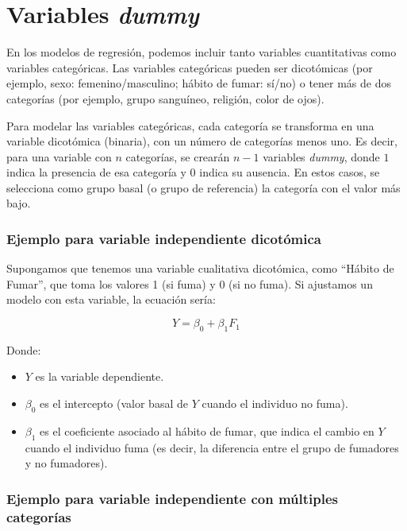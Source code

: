 \documentclass[
  spanish,
  a4paper,
]{scrbook}
\begin{document}
\section{\texorpdfstring{Variables
\emph{dummy}}{Variables dummy}}\label{variables-dummy}

En los modelos de regresión, podemos incluir tanto variables
cuantitativas como variables categóricas. Las variables categóricas
pueden ser dicotómicas (por ejemplo, sexo: femenino/masculino; hábito de
fumar: sí/no) o tener más de dos categorías (por ejemplo, grupo
sanguíneo, religión, color de ojos).

Para modelar las variables categóricas, cada categoría se transforma en
una variable dicotómica (binaria), con un número de categorías menos
uno. Es decir, para una variable con \(n\) categorías, se crearán
\(n-1\) variables \emph{dummy}, donde \(1\) indica la presencia de esa
categoría y \(0\) indica su ausencia. En estos casos, se selecciona como
grupo basal (o grupo de referencia) la categoría con el valor más bajo.

\subsubsection{Ejemplo para variable independiente
dicotómica}\label{ejemplo-para-variable-independiente-dicotuxf3mica}

Supongamos que tenemos una variable cualitativa dicotómica, como
``Hábito de Fumar'', que toma los valores 1 (si fuma) y 0 (si no fuma).
Si ajustamos un modelo con esta variable, la ecuación sería:

\[ 
Y = \beta_0+\beta_1F_1  
\]

Donde:

\begin{itemize}
\item
  \(Y\) es la variable dependiente.
\item
  \(\beta_0\) es el intercepto (valor basal de \(Y\) cuando el individuo
  no fuma).
\item
  \(\beta_1\) es el coeficiente asociado al hábito de fumar, que indica
  el cambio en \(Y\) cuando el individuo fuma (es decir, la diferencia
  entre el grupo de fumadores y no fumadores).
\end{itemize}

\subsubsection{Ejemplo para variable independiente con múltiples
categorías}\label{ejemplo-para-variable-independiente-con-muxfaltiples-categoruxedas}
\end{document}
